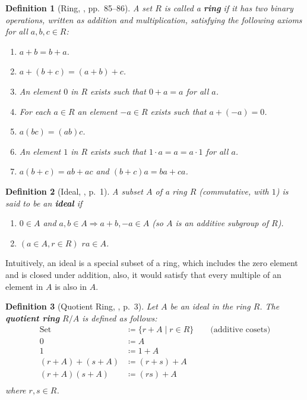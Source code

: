 \documentclass[12pt]{article}
\newtheorem{definition}{Definition}[section]
\begin{document}
\begin{definition}[Ring, \cite{algebra}, pp.~85--86]
    A set $R$ is called a \textbf{ring} if it has two binary operations, written as addition and multiplication, 
    satisfying the following axioms for all $a, b, c \in R$:
    \begin{enumerate}
        \item $a + b = b + a$.
        \item $a + (b + c) = (a + b) + c$.
        \item An element $0$ in $R$ exists such that $0 + a = a$ for all $a$.
        \item For each $a \in R$ an element $-a \in R$ exists such that $a + (-a) = 0$.
        \item $a(bc) = (ab)c$.
        \item An element $1$ in $R$ exists such that $1 \cdot a = a = a \cdot 1$ for all $a$.
        \item $a (b + c) = ab + ac$ and $(b + c)a = ba + ca$.
    \end{enumerate}
\end{definition}

\begin{definition}[Ideal, \cite{ideal_quotientring}, p.~1]
    A subset $A$ of a ring $R$ (commutative, with $1$) is said to be an \textbf{ideal} if
    \begin{enumerate}
        \item $0 \in A$ and $a, b \in A \Rightarrow a + b, -a \in A$ (so $A$ is an additive subgroup of $R$).
        \item $(a \in A, r \in R)$ $ra \in A$.
    \end{enumerate}
\end{definition}

Intuitively, 
an ideal is a special subset of a ring, 
which includes the zero element and is closed under addition, 
also, it would satisfy that every multiple of an element in $A$ is also in $A$.

\begin{definition}[Quotient Ring, \cite{ideal_quotientring}, p.~3]
    Let $A$ be an ideal in the ring $R$.
    The \textbf{quotient ring} $R/A$ is defined as follows:
    \begin{align*}
        \text{Set} &\coloneq \{r + A \mid r \in R\} \qquad \text{(additive cosets)} \\
        0 &\coloneq A \\
        1 &\coloneq 1 + A \\
        (r + A) + (s + A) &\coloneq (r + s) + A \\
        (r + A)(s + A) &\coloneq (rs) + A \\
    \end{align*}
    where $r, s \in R$.
\end{definition}
\end{document}

